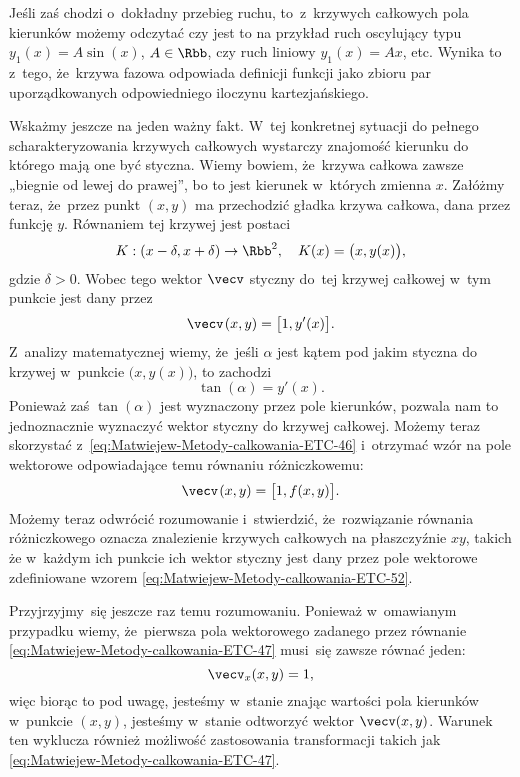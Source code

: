 \documentclass[a4paper,11pt]{article}
\numberwithin{equation}{section}
\begin{document}
Jeśli zaś chodzi o~dokładny przebieg ruchu, to~z~krzywych całkowych pola
kierunków możemy odczytać czy jest to na przykład ruch oscylujący typu
$y_{ 1 }( x ) = A \sin( x )$, $A \in \Rbb$, czy ruch liniowy
$y_{ 1 }( x ) = A x$, etc. Wynika to z~tego, że~krzywa fazowa odpowiada
definicji funkcji jako zbioru par uporządkowanych odpowiedniego iloczynu
kartezjańskiego.

Wskażmy jeszcze na jeden ważny fakt. W~tej konkretnej sytuacji do pełnego
scharakteryzowania krzywych całkowych wystarczy znajomość kierunku do
którego mają one być styczna. Wiemy bowiem, że~krzywa całkowa zawsze
„biegnie od lewej do prawej”, bo to jest kierunek w~których zmienna $x$.
Załóżmy teraz, że~przez punkt $( x, y )$ ma przechodzić gładka krzywa
całkowa, dana przez funkcję $y$. Równaniem tej krzywej jest postaci
\begin{equation}
  \label{eq:Uwagi-do-konkrentych-stron-30}
  K : ( x - \delta, x + \delta ) \to \Rbb^{ 2 }, \quad
  K( x ) = \big( x, y( x ) \big),
\end{equation}
gdzie $\delta > 0$. Wobec tego wektor $\vecv$ styczny do~tej krzywej całkowej
w~tym punkcie jest dany przez
\begin{equation}
  \label{eq:Uwagi-do-konkrentych-stron-31}
  \vecv \HorSpaceThree ( x, y ) =
  \big[ 1, y'( x ) \big].
\end{equation}
Z~analizy matematycznej wiemy, że~jeśli $\alpha$ jest kątem pod jakim styczna do
krzywej w~punkcie $\big( x, y( x ) \big)$, to zachodzi
\begin{equation}
  \label{eq:Uwagi-do-konkrentych-stron-32}
  \tan( \alpha ) = y'( x ).
\end{equation}
Ponieważ zaś $\tan( \alpha )$ jest wyznaczony przez pole kierunków, pozwala nam
to jednoznacznie wyznaczyć wektor styczny do krzywej całkowej. Możemy teraz
skorzystać z~\eqref{eq:Matwiejew-Metody-calkowania-ETC-46} i~otrzymać wzór
na pole wektorowe odpowiadające temu równaniu różniczkowemu:
\begin{equation}
  \label{eq:Uwagi-do-konkrentych-stron-33}
  \vecv \HorSpaceThree ( x, y ) =
  \big[ 1, f( x, y ) \big].
\end{equation}
Możemy teraz odwrócić rozumowanie i~stwierdzić, że~rozwiązanie równania
różniczkowego oznacza znalezienie krzywych całkowych na płaszczyźnie $xy$,
takich że w~każdym ich punkcie ich wektor styczny jest dany przez pole
wektorowe zdefiniowane wzorem \eqref{eq:Matwiejew-Metody-calkowania-ETC-52}.

Przyjrzyjmy~się jeszcze raz temu rozumowaniu. Ponieważ w~omawianym
przypadku wiemy, że~pierwsza pola wektorowego zadanego przez równanie
\eqref{eq:Matwiejew-Metody-calkowania-ETC-47} musi~się zawsze równać jeden:
\begin{equation}
  \label{eq:Uwagi-do-konkrentych-stron-34}
  \vecv_{ x }( x, y ) = 1,
\end{equation}
więc biorąc to pod uwagę, jesteśmy w~stanie znając wartości pola kierunków
w~punkcie $( x, y )$, jesteśmy w~stanie odtworzyć wektor $\vecv( x, y )$.
Warunek ten wyklucza również możliwość zastosowania transformacji takich jak
\eqref{eq:Matwiejew-Metody-calkowania-ETC-47}.
\end{document}
